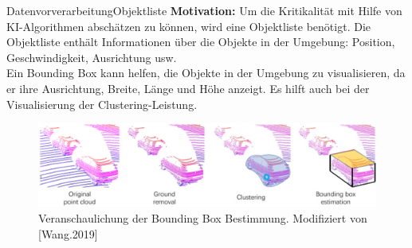 \documentclass[169, handout	]{THIbeamer} %
\begin{document}
	\begin{frame}{Datenvorverarbeitung}{Objektliste}
		\footnotesize
	\textbf{Motivation:} Um die Kritikalität mit Hilfe von KI-Algorithmen abschätzen zu können, wird eine Objektliste benötigt. Die Objektliste enthält Informationen über die Objekte in der Umgebung: Position, Geschwindigkeit, Ausrichtung usw.\\
	Ein Bounding Box kann helfen, die Objekte in der Umgebung zu visualisieren, da er ihre Ausrichtung, Breite, Länge und Höhe anzeigt. Es hilft auch bei der Visualisierung der Clustering-Leistung.
		\begin{figure}
			\includegraphics[scale=0.4]{required/Bounding_Box.jpg}
			\caption{Veranschaulichung der Bounding Box Bestimmung. Modifiziert von [Wang.2019]}
        	\label{Ground Subtraction}
       	\end{figure}
	\end{frame}
\end{document}
